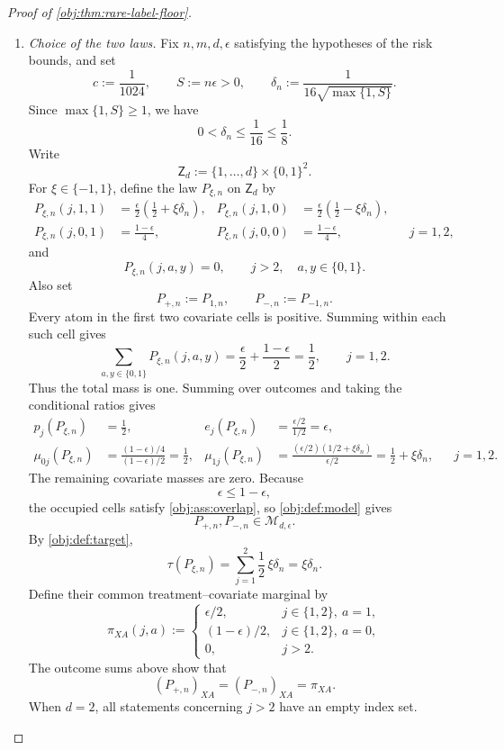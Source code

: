 \documentclass[11pt]{article}
\begin{document}
\begin{proof}[Proof of \cref{obj:thm:rare-label-floor}]
\begin{enumerate}
\item \textit{Choice of the two laws.}
Fix \(n,m,d,\epsilon\) satisfying the hypotheses of the risk bounds, and set
\[
c:=\frac1{1024},
\qquad
S:=n\epsilon>0,
\qquad
\delta_n:=\frac1{16\sqrt{\max\{1,S\}}}.
\]
Since \(\max\{1,S\}\ge1\), we have
\[
0<\delta_n\le\frac1{16}\le\frac18.
\]
Write
\[
\mathsf Z_d:=\{1,\ldots,d\}\times\{0,1\}^2.
\]
For \(\xi\in\{-1,1\}\), define the law \(P_{\xi,n}\) on \(\mathsf Z_d\) by
\[
\begin{aligned}
P_{\xi,n}(j,1,1)&=\frac{\epsilon}{2}\left(\frac12+\xi\delta_n\right),&
P_{\xi,n}(j,1,0)&=\frac{\epsilon}{2}\left(\frac12-\xi\delta_n\right),\\
P_{\xi,n}(j,0,1)&=\frac{1-\epsilon}{4},&
P_{\xi,n}(j,0,0)&=\frac{1-\epsilon}{4},
&&j=1,2,
\end{aligned}
\]
and
\[
P_{\xi,n}(j,a,y)=0,
\qquad j>2,\quad a,y\in\{0,1\}.
\]
Also set
\[
P_{+,n}:=P_{1,n},
\qquad
P_{-,n}:=P_{-1,n}.
\]
Every atom in the first two covariate cells is positive. Summing within each such cell gives
\[
\sum_{a,y\in\{0,1\}}P_{\xi,n}(j,a,y)
=
\frac{\epsilon}{2}+\frac{1-\epsilon}{2}
=\frac12,
\qquad j=1,2.
\]
Thus the total mass is one. Summing over outcomes and taking the conditional ratios gives
\[
\begin{aligned}
p_j(P_{\xi,n})&=\frac12,
&
e_j(P_{\xi,n})&=\frac{\epsilon/2}{1/2}=\epsilon,\\
\mu_{0j}(P_{\xi,n})&=
\frac{(1-\epsilon)/4}{(1-\epsilon)/2}=\frac12,
&
\mu_{1j}(P_{\xi,n})&=
\frac{(\epsilon/2)(1/2+\xi\delta_n)}{\epsilon/2}
=\frac12+\xi\delta_n,
&&j=1,2.
\end{aligned}
\]
The remaining covariate masses are zero. Because
\[
\epsilon\le1-\epsilon,
\]
the occupied cells satisfy \cref{obj:ass:overlap}, so \cref{obj:def:model} gives
\[
P_{+,n},P_{-,n}\in\mathcal M_{d,\epsilon}.
\]
By \cref{obj:def:target},
\[
\tau(P_{\xi,n})
=
\sum_{j=1}^{2}\frac12\,\xi\delta_n
=\xi\delta_n.
\]
Define their common treatment--covariate marginal by
\[
\pi_{XA}(j,a):=
\begin{cases}
\epsilon/2,&j\in\{1,2\},\ a=1,\\
(1-\epsilon)/2,&j\in\{1,2\},\ a=0,\\
0,&j>2.
\end{cases}
\]
The outcome sums above show that
\[
(P_{+,n})_{XA}=(P_{-,n})_{XA}=\pi_{XA}.
\]
When \(d=2\), all statements concerning \(j>2\) have an empty index set.


\end{enumerate}
\end{proof}
\end{document}
